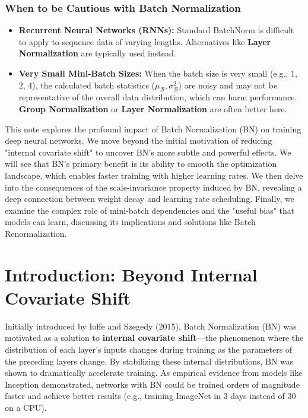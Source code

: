 \documentclass{article}
\begin{document}
\subsubsection*{When to be Cautious with Batch Normalization}
\begin{itemize}
    \item \textbf{Recurrent Neural Networks (RNNs):} Standard BatchNorm is difficult to apply to sequence data of varying lengths. Alternatives like \textbf{Layer Normalization} are typically used instead.
    \item \textbf{Very Small Mini-Batch Sizes:} When the batch size is very small (e.g., 1, 2, 4), the calculated batch statistics ($\mu_{\mathcal{B}}, \sigma^2_{\mathcal{B}}$) are noisy and may not be representative of the overall data distribution, which can harm performance. \textbf{Group Normalization} or \textbf{Layer Normalization} are often better here.
\end{itemize}






\newpage
    This note explores the profound impact of Batch Normalization (BN) on training deep neural networks. We move beyond the initial motivation of reducing "internal covariate shift" to uncover BN's more subtle and powerful effects. We will see that BN's primary benefit is its ability to smooth the optimization landscape, which enables faster training with higher learning rates. We then delve into the consequences of the scale-invariance property induced by BN, revealing a deep connection between weight decay and learning rate scheduling. Finally, we examine the complex role of mini-batch dependencies and the "useful bias" that models can learn, discussing its implications and solutions like Batch Renormalization.

\section{Introduction: Beyond Internal Covariate Shift}
Initially introduced by Ioffe and Szegedy (2015), Batch Normalization (BN) was motivated as a solution to \textbf{internal covariate shift}---the phenomenon where the distribution of each layer's inputs changes during training as the parameters of the preceding layers change. By stabilizing these internal distributions, BN was shown to dramatically accelerate training. As empirical evidence from models like Inception demonstrated, networks with BN could be trained orders of magnitude faster and achieve better results (e.g., training ImageNet in 3 days instead of 30 on a CPU).
\end{document}
